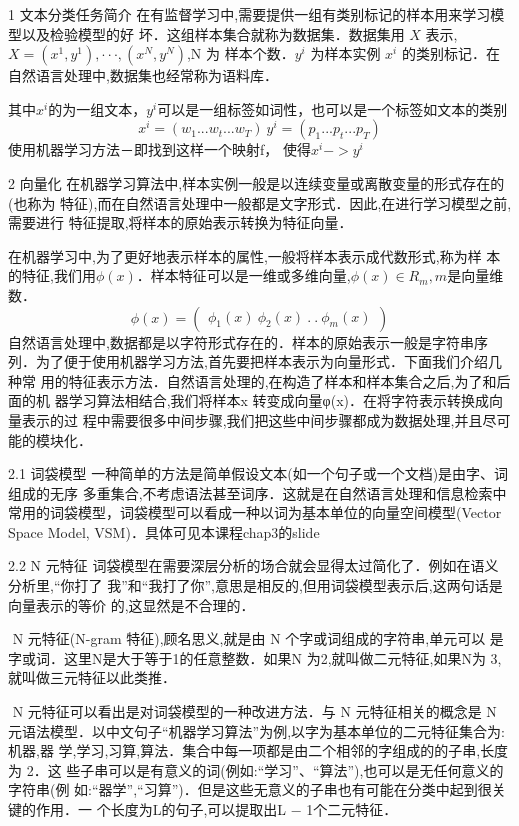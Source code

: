 1 文本分类任务简介
​ 在有监督学习中,需要提供一组有类别标记的样本用来学习模型以及检验模型的好 坏．这组样本集合就称为数据集．数据集用 $X$ 表示,$X = {(x^1 , y^1 ), · · · , (x^N , y^N )}$,N 为 样本个数．$y^i$ 为样本实例 $x^i$ 的类别标记．在自然语言处理中,数据集也经常称为语料库．

其中$x^i$的为一组文本，$y^i$可以是一组标签如词性，也可以是一个标签如文本的类别 $$ x^i = (w_1...w_t...w_T)\ y^i=(p_1...p_t...p_T) $$ 使用机器学习方法－即找到这样一个映射f， 使得$x^{i}->y^{i}$

2 向量化
​ 在机器学习算法中,样本实例一般是以连续变量或离散变量的形式存在的(也称为 特征),而在自然语言处理中一般都是文字形式．因此,在进行学习模型之前,需要进行 特征提取,将样本的原始表示转换为特征向量．

​ 在机器学习中,为了更好地表示样本的属性,一般将样本表示成代数形式,称为样 本的特征,我们用$\phi(x)$．样本特征可以是一维或多维向量,$\phi(x) ∈ R_m,m$是向量维数． $$ \phi(x) = \left( \begin{array} {ccc} \phi_1(x) \ \phi_2 (x) \ .\ .\ \phi_m(x) \end{array} \right) $$​ 自然语言处理中,数据都是以字符形式存在的．样本的原始表示一般是字符串序 列．为了便于使用机器学习方法,首先要把样本表示为向量形式．下面我们介绍几种常 用的特征表示方法．自然语言处理的,在构造了样本和样本集合之后,为了和后面的机 器学习算法相结合,我们将样本x 转变成向量φ(x)．在将字符表示转换成向量表示的过 程中需要很多中间步骤,我们把这些中间步骤都成为数据处理,并且尽可能的模块化．

2.1 词袋模型
​ 一种简单的方法是简单假设文本(如一个句子或一个文档)是由字、词组成的无序 多重集合,不考虑语法甚至词序．这就是在自然语言处理和信息检索中常用的词袋模型，词袋模型可以看成一种以词为基本单位的向量空间模型(Vector Space Model, VSM)．具体可见本课程chap3的slide

2.2 N 元特征
​ 词袋模型在需要深层分析的场合就会显得太过简化了．例如在语义分析里,“你打了 我”和“我打了你”,意思是相反的,但用词袋模型表示后,这两句话是向量表示的等价 的,这显然是不合理的．

​ N 元特征(N-gram 特征),顾名思义,就是由 N 个字或词组成的字符串,单元可以 是字或词．这里N是大于等于1的任意整数．如果N 为2,就叫做二元特征,如果N为 3,就叫做三元特征以此类推．

​ N 元特征可以看出是对词袋模型的一种改进方法．与 N 元特征相关的概念是 N 元语法模型．以中文句子“机器学习算法”为例,以字为基本单位的二元特征集合为:{机器,器 学,学习,习算,算法}．集合中每一项都是由二个相邻的字组成的的子串,长度为 2．这 些子串可以是有意义的词(例如:“学习”、“算法”),也可以是无任何意义的字符串(例 如:“器学”,“习算”)．但是这些无意义的子串也有可能在分类中起到很关键的作用．一 个长度为L的句子,可以提取出L − 1个二元特征．

